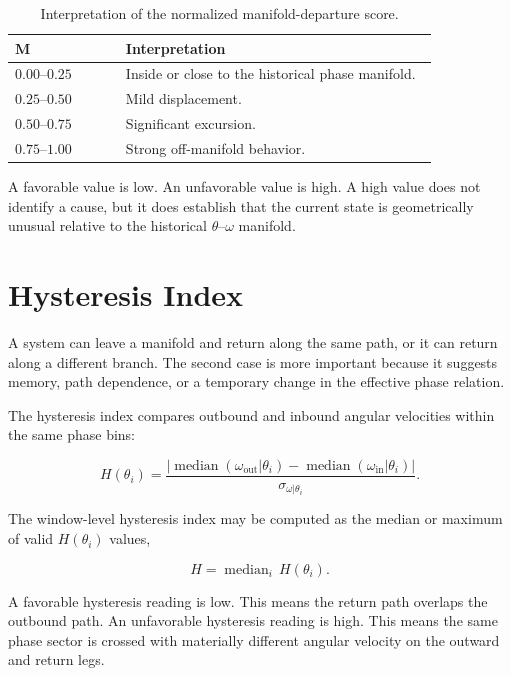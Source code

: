 \documentclass[11pt]{article}
\begin{document}
\begin{table}[H]
\centering
\caption{Interpretation of the normalized manifold-departure score.}
\begin{tabular}{>{\raggedleft\arraybackslash}p{0.22\linewidth} p{0.62\linewidth}}
\toprule
\(\boldsymbol{M}\) & Interpretation \\
\midrule
\(0.00\)--\(0.25\) & Inside or close to the historical phase manifold. \\
\(0.25\)--\(0.50\) & Mild displacement. \\
\(0.50\)--\(0.75\) & Significant excursion. \\
\(0.75\)--\(1.00\) & Strong off-manifold behavior. \\
\bottomrule
\end{tabular}
\end{table}

A favorable value is low. An unfavorable value is high. A high value does not identify a cause, but it does establish that the current state is geometrically unusual relative to the historical \(\theta\)--\(\omega\) manifold.

\section{Hysteresis Index}

A system can leave a manifold and return along the same path, or it can return along a different branch. The second case is more important because it suggests memory, path dependence, or a temporary change in the effective phase relation.

The hysteresis index compares outbound and inbound angular velocities within the same phase bins:

\begin{equation}
H(\theta_i) =
\frac{\left|\operatorname{median}(\omega_{\mathrm{out}}|\theta_i)-
\operatorname{median}(\omega_{\mathrm{in}}|\theta_i)\right|}
{\sigma_{\omega|\theta_i}}.
\end{equation}

The window-level hysteresis index may be computed as the median or maximum of valid \(H(\theta_i)\) values,

\begin{equation}
H = \operatorname{median}_{i}\,H(\theta_i).
\end{equation}

A favorable hysteresis reading is low. This means the return path overlaps the outbound path. An unfavorable hysteresis reading is high. This means the same phase sector is crossed with materially different angular velocity on the outward and return legs.
\end{document}
